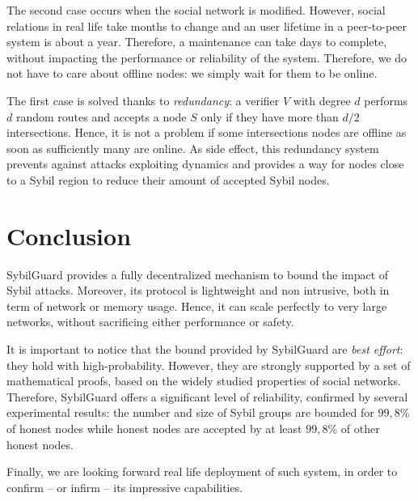 \documentclass[a4paper,11pt]{article}
\begin{document}
The second case occurs when the social network is modified. However,
social relations in real life take months to change and an user
lifetime in a peer-to-peer system is about a year. Therefore, a
maintenance can take days to complete, without impacting the
performance or reliability of the system. Therefore, we do not have to
care about offline nodes: we simply wait for them to be online.

The first case is solved thanks to \emph{redundancy}: a verifier $V$
with degree $d$ performs $d$ random routes and accepts a node $S$ only
if they have more than $d/2$ intersections.  Hence, it is not a
problem if some intersections nodes are offline as soon as
sufficiently many are online. As side effect, this redundancy system
prevents against attacks exploiting dynamics and provides a
way for nodes close to a Sybil region to reduce their amount of
accepted Sybil nodes.

\section*{Conclusion}


SybilGuard provides a fully decentralized mechanism to bound the
impact of Sybil attacks. Moreover, its protocol is lightweight and non
intrusive, both in term of network or memory usage. Hence, it can
scale perfectly to very large networks, without sacrificing either
performance or safety.


It is important to notice that the bound provided by SybilGuard are
\emph{best effort}: they hold with high-probability. However, they are
strongly supported by a set of mathematical proofs, based on the
widely studied properties of social networks. Therefore, SybilGuard
offers a significant level of reliability, confirmed by several
experimental results: the number and size of Sybil groups are bounded
for $99,8\%$ of honest nodes while honest nodes are accepted by at
least $99,8\%$ of other honest nodes.


Finally, we are looking forward real life deployment of such system,
in order to confirm -- or infirm -- its impressive capabilities.



{}

\end{document}
